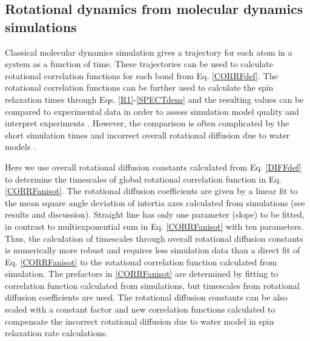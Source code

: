 \documentclass[pre,aps,floatfix,authordate1-4,twocolumn]{revtex4-1}
\begin{document}

\subsection{Rotational dynamics from molecular dynamics simulations}\label{MDanalysis}
Classical molecular dynamics simulation gives a trajectory for each atom in
a system as a function of time. These trajectories can be used to
calculate rotational correlation functions for each bond from Eq. \ref{CORRFdef}.
The rotational correlation functions can be further used to calculate the
spin relaxation times through Eqs. \ref{R1}-\ref{SPECTdens} and the resulting
values can be compared to experimental data in order to assess simulation model
quality \cite{??} and interpret experiments \cite{??}.
However, the comparison is often complicated by
the short simulation times \cite{??} and incorrect overall rotational
diffusion due to water models \cite{??}.

Here we use overall rotational diffusion constants
calculated from Eq. \ref{DIFFdef} to determine 
the timescales of global rotational correlation function
in Eq. \ref{CORRFanisot}. The rotational
diffusion coefficients are given by a linear fit
to the mean square angle deviation of intertia axes calculated from
simulations (see results and discussion).
Straight line has only one parameter (slope) to be fitted,
in contrast to multiexponential sum in Eq. \ref{CORRFanisot}
with ten parameters. 
Thus, the calculation of timescales through overall
rotational diffusion constants is numerically more robust and requires
less simulation data than a direct fit of
Eq. \ref{CORRFanisot} to the rotational correlation function calculated
from simulation.
The prefactors in \ref{CORRFanisot} are determined by
fitting to correlation function calculated from simulations,
but timescales from rotational diffusion coefficients are
used. The rotational diffusion constants
can be also scaled with a constant factor and new correlation functions
calculated to compensate the incorrect rotational diffusion due to
water model in spin relaxation rate calculations.
\end{document}
